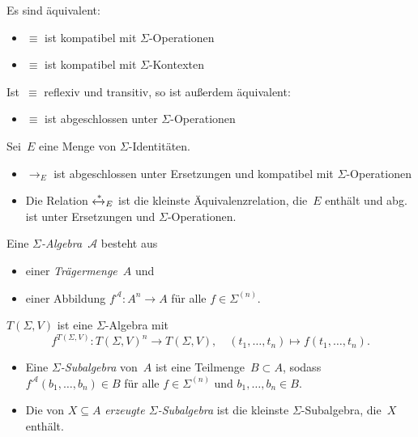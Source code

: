 \documentclass{cheat-sheet}
\newcommand{\zzEq}{\xleftrightarrow{*}} %
\renewcommand{\Alg}{\mathcal{A}} %
\begin{document}
\begin{lem}
  Es sind äquivalent:
  \begin{itemize}
    \item $\equiv$ ist kompatibel mit $\Sigma$-Operationen
    \item $\equiv$ ist kompatibel mit $\Sigma$-Kontexten
  \end{itemize}
  Ist~$\equiv$ reflexiv und transitiv, so ist außerdem äquivalent:
  \begin{itemize}
    \item $\equiv$ ist abgeschlossen unter $\Sigma$-Operationen
  \end{itemize}
\end{lem}

\begin{thm}
  Sei~$E$ eine Menge von $\Sigma$-Identitäten.
  \begin{itemize}
    \item $\to_E$ ist abgeschlossen unter Ersetzungen und kompatibel mit $\Sigma$-Operationen
    \item Die Relation $\zzEq_E$ ist die kleinste Äquivalenzrelation, die~$E$ enthält und abg. ist unter Ersetzungen und $\Sigma$-Operationen.
  \end{itemize}
\end{thm}


\begin{defn}
  Eine \emph{$\Sigma$-Algebra}~$\Alg$ besteht aus
  \begin{itemize}
    \item einer \textit{Trägermenge}~$A$ und
    \item einer Abbildung $f^\Alg : A^n \to A$ für alle $f \in \Sigma^{(n)}$.
  \end{itemize}
\end{defn}

\begin{bsp}
  $T(\Sigma, V)$ ist eine $\Sigma$-Algebra mit
  \[
    f^{T(\Sigma, V)} : T(\Sigma, V)^n \to T(\Sigma, V), \quad
    (t_1, \ldots, t_n) \mapsto f(t_1, \ldots, t_n).
  \]
\end{bsp}

\begin{defn}
  \begin{itemize}
    \item Eine \emph{$\Sigma$-Subalgebra} von~$A$ ist eine Teilmenge~$B \subset A$, sodass $f^\Alg(b_1, \ldots, b_n) \in B$ für alle $f \in \Sigma^{(n)}$ und $b_1, \ldots, b_n \in B$.
    \item Die von $X \subseteq A$ \emph{erzeugte $\Sigma$-Subalgebra} ist die kleinste $\Sigma$-Subalgebra, die~$X$ enthält.
  \end{itemize}
\end{defn}
\end{document}
